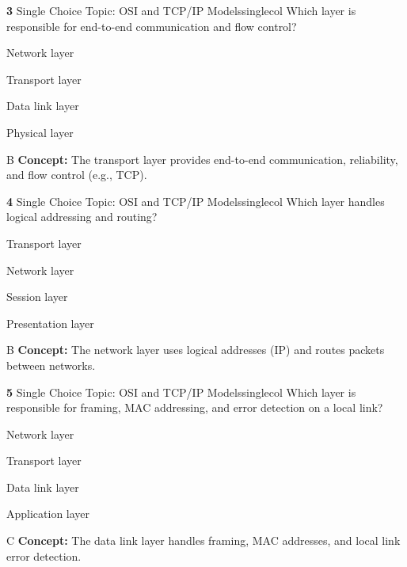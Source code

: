 \documentclass[10pt,a4paper]{article}
\begin{document}
\begin{qcard}{\color{white}\textbf{3} \hfill \small Single Choice \textbar{} Topic: OSI and TCP/IP Models}{singlecol}
Which layer is responsible for end-to-end communication and flow control?

\begin{qoptions}
\item Network layer
\item Transport layer
\item Data link layer
\item Physical layer
\end{qoptions}
\begin{explainbox}{B}
\textbf{Concept:} The transport layer provides end-to-end communication, reliability, and flow control (e.g., TCP).
\end{explainbox}
\end{qcard}

\begin{qcard}{\color{white}\textbf{4} \hfill \small Single Choice \textbar{} Topic: OSI and TCP/IP Models}{singlecol}
Which layer handles logical addressing and routing?

\begin{qoptions}
\item Transport layer
\item Network layer
\item Session layer
\item Presentation layer
\end{qoptions}
\begin{explainbox}{B}
\textbf{Concept:} The network layer uses logical addresses (IP) and routes packets between networks.
\end{explainbox}
\end{qcard}

\begin{qcard}{\color{white}\textbf{5} \hfill \small Single Choice \textbar{} Topic: OSI and TCP/IP Models}{singlecol}
Which layer is responsible for framing, MAC addressing, and error detection on a local link?

\begin{qoptions}
\item Network layer
\item Transport layer
\item Data link layer
\item Application layer
\end{qoptions}
\begin{explainbox}{C}
\textbf{Concept:} The data link layer handles framing, MAC addresses, and local link error detection.
\end{explainbox}
\end{qcard}
\end{document}
